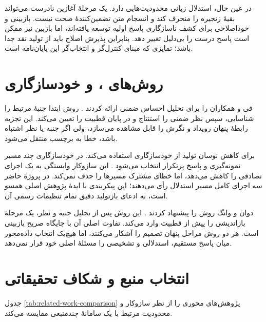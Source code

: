در عین حال، استدلال زبانی محدودیت‌هایی دارد. یک مرحلۀ آغازین نادرست می‌تواند بقیۀ زنجیره را منحرف کند و انسجام متن تضمین‌کنندۀ صحت نیست. بازبینی و خوداصلاحی برای کشف ناسازگاری پاسخ اولیه توسعه یافته‌اند، اما بازبین نیز ممکن است پاسخ درست را بی‌دلیل تغییر دهد. بنابراین پذیرش اصلاح باید از تولید نقد جدا باشد؛ تمایزی که مبنای کنترل‌گر و انتخاب‌گر این پایان‌نامه است.

\section{روش‌های ،  و خودسازگاری}

فی و همکاران  را برای تحلیل احساس ضمنی ارائه کردند \cite{fei2023thor}. روش ابتدا جنبۀ مرتبط را شناسایی، سپس نظر ضمنی را استنتاج و در پایان قطبیت را تعیین می‌کند. این تجزیه رابطۀ پنهان رویداد و نگرش را قابل مشاهده می‌سازد، ولی اگر جنبه یا نظر اشتباه باشد، خطا به برچسب منتقل می‌شود.

 برای کاهش نوسان تولید از خودسازگاری استفاده می‌کند. در خودسازگاری چند مسیر نمونه‌گیری و پاسخ پرتکرار انتخاب می‌شود \cite{wang2023selfconsistency}. این سازوکار وابستگی به یک اجرای تصادفی را کاهش می‌دهد، اما خطای مشترک مسیرها را حذف نمی‌کند. در پروژۀ حاضر سه اجرای کامل مسیر استدلال رأی می‌دهند؛ این پیکربندی با ایدۀ پژوهش اصلی همسو است، نه ادعای بازتولید دقیق تمام تنظیمات رسمی آن.

دوان و وانگ روش  را پیشنهاد کردند \cite{duan2024isa}. این روش پس از تحلیل جنبه و نظر، یک مرحلۀ بازاندیشی را پیش از قطبیت وارد می‌کند. تفاوت اصلی آن با  جایگاه صریح بازبینی است. هر دو روش مراحل پنهان تصمیم را آشکار می‌کنند، اما هیچ‌یک انتخاب داده‌محور میان پاسخ مستقیم، استدلالی و تشخیصی را مسئلۀ اصلی خود قرار نمی‌دهد.

\section{انتخاب منبع و شکاف تحقیقاتی}

جدول \ref{tab:related-work-comparison} پژوهش‌های محوری را از نظر سازوکار و محدودیت مرتبط با یک سامانۀ چندمنبعی مقایسه می‌کند.

